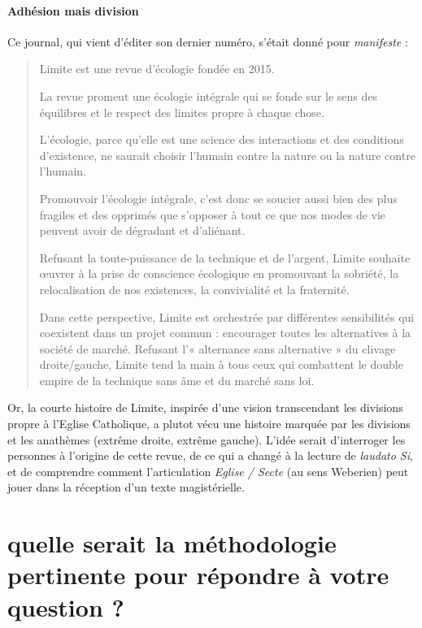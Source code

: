 \paragraph{Adhésion mais division} Ce journal, qui vient d'éditer son dernier numéro, s'était donné pour \textit{manifeste} : 
\begin{quote}
    Limite est une revue d’écologie fondée en 2015.

La revue promeut une écologie intégrale qui se fonde sur le sens des équilibres et le respect des limites propre à chaque chose.

L’écologie, parce qu’elle est une science des interactions et des conditions d’existence, ne saurait choisir l’humain contre la nature ou la nature contre l’humain.

Promouvoir l’écologie intégrale, c’est donc se soucier aussi bien des plus fragiles et des opprimés que s’opposer à tout ce que nos modes de vie peuvent avoir de dégradant et d’aliénant.

Refusant la toute-puissance de la technique et de l’argent, Limite souhaite œuvrer à la prise de conscience écologique en promouvant la sobriété, la relocalisation de nos existences, la convivialité et la fraternité.

Dans cette perspective, Limite est orchestrée par différentes sensibilités qui coexistent dans un projet commun : encourager toutes les alternatives à la société de marché. Refusant l’« alternance sans alternative » du clivage droite/gauche, Limite tend la main à tous ceux qui combattent le double empire de la technique sans âme et du marché sans loi.
\end{quote}

Or, la courte histoire de Limite, inspirée d'une vision transcendant les divisions propre à l'Eglise Catholique, a plutot vécu une histoire marquée par les divisions et les anathèmes (extrême droite, extrême gauche). 
L'idée serait d'interroger les personnes à l'origine de cette revue, de ce qui a changé à la lecture de \textit{laudato Si},  et de comprendre comment l'articulation \textit{Eglise / Secte} (au sens Weberien) peut jouer dans la réception d'un texte magistérielle.


\section{quelle serait la méthodologie pertinente pour répondre à votre question ?}


